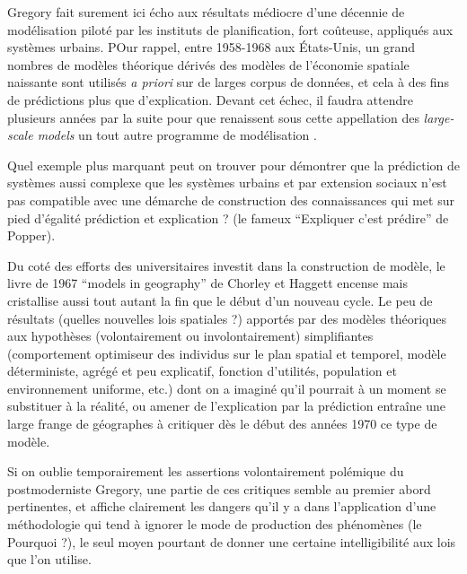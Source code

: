 Gregory fait surement ici écho aux résultats médiocre \autocite{Lee1973} d'une décennie de modélisation piloté par les instituts de planification, fort coûteuse, appliqués aux systèmes urbains. POur rappel, entre 1958-1968 aux États-Unis, un grand nombres de modèles théorique \autocite[7-9]{Batty1979} dérivés des modèles de l'économie spatiale naissante sont utilisés \textit{a priori} sur de larges corpus de données, et cela à des fins de prédictions plus que d'explication. Devant cet échec, il faudra attendre plusieurs années par la suite pour que renaissent sous cette appellation des \textit{large-scale models} un tout autre programme de modélisation \autocite{Boyce1988}.

Quel exemple plus marquant peut on trouver pour démontrer que la prédiction de systèmes aussi complexe que les systèmes urbains et par extension sociaux n'est pas compatible avec une démarche de construction des connaissances qui met sur pied d'égalité prédiction et explication ? (le fameux \enquote{Expliquer c'est prédire} de Popper).

Du coté des efforts des universitaires investit dans la construction de modèle, le livre de 1967 \foreignquote{english}{models in geography} de Chorley et Haggett encense mais cristallise aussi \textcite{Golledge2006} tout autant la fin que le début d'un nouveau cycle. Le peu de résultats (quelles nouvelles lois spatiales ?) apportés par des modèles théoriques aux hypothèses (volontairement ou involontairement) simplifiantes (comportement optimiseur des individus sur le plan spatial et temporel, modèle déterministe, agrégé et peu explicatif, fonction d'utilités, population et environnement uniforme, etc.) dont on a imaginé qu'il pourrait à un moment se substituer à la réalité, ou amener de l'explication par la prédiction \autocite[41]{Gregory1978} entraîne une large frange de géographes à critiquer dès le début des années 1970 ce type de modèle.

Si on oublie temporairement les assertions volontairement polémique du postmoderniste Gregory, une partie de ces critiques semble au premier abord pertinentes, et affiche clairement les dangers qu'il y a dans l'application d'une méthodologie qui tend à ignorer le mode de production des phénomènes (le Pourquoi ?), le seul moyen pourtant de donner une certaine intelligibilité aux lois que l'on utilise. \autocite[14-15]{Besse2000}



